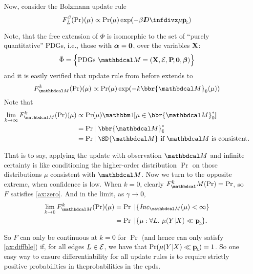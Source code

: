 \documentclass{article}
\begin{document}
Now, consider the Bolzmann update rule
\[
    F_L^{\beta}(\Pr) (\mu) \propto \Pr(\mu) \exp(-\beta \kldiv\mu \bp)
\]

Note, that the free extension of $\Phi$ is isomorphic to the set of ``purely quantitative'' PDGs, i.e., those with $\boldsymbol\alpha = \mathbf{0}$, over the variables $\mathbf{X}$:
$$
    \bar\Phi = \Big\{ \text{PDGs}~\dg M = (\mat X, \Ed, \bP[], \mat0, \bbeta) \Big\}
$$
and it is easily verified that update rule from before extends to
\[
    F_{\dg M}^k(\Pr)(\mu) \propto \Pr(\mu) \exp(- k \bbr{\dg M}_0(\mu))
\]
Note that
\begin{align*}
    \lim_{k \to \infty} F_{\dg M}^k(\Pr)(\mu) &\propto
        \Pr(\mu) \mathbbm1[\mu \in {\bbr{\dg M}^*_0}] \\
        &= \Pr \,|\, \bbr{\dg M}^*_0 \\
        &= \Pr \,|\, \SD{\dg M} \text{~if $\dg M$ is consistent.}
\end{align*}

That is to say, applying the update with observation $\dg M$ and infinite certainty is like conditioning the higher-order distribution $\Pr$ on those distributions $\mu$ consistent with $\dg M$.
Now we turn to the opposite extreme, when confidence is low. When $k=0$, clearly $F^k_\dg M(\Pr) = \Pr$, so $F$ satisfies \cref{ax:zero}. And in the limit, as $\gamma \to 0$,
\begin{align*}
    \lim_{k \to 0} F_{\dg M}^k(\Pr)(\mu) &= \Pr \,|\, \{ \Inc_{\dg M}(\mu) < \infty \} \\
        &= \Pr \,|\, \{\mu : \forall L.~\mu(Y|X) \ll \bp \}.
\end{align*}

So $F$ can only be continuous at $k=0$ for $\Pr$ (and hence can only satisfy \cref{ax:diffble}) if, for all edges $L \in \mathcal E$, we have that $\Pr(\mu(Y|X) \ll \mathbf{p}_{\!_{L}\!}) = 1$.
So one easy way to ensure differentiability for all update rules is to require strictly positive probabilities in theprobabilities in the cpds.
\end{document}
